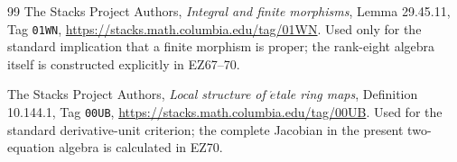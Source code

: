 \documentclass[11pt]{article}
\theoremstyle{definition}\newtheorem{definition}[theorem]{Definition}
\theoremstyle{remark}\newtheorem{remark}[theorem]{Remark}
\begin{document}
\begin{thebibliography}{99}
The Stacks Project Authors,
\emph{Integral and finite morphisms},
Lemma 29.45.11, Tag \texttt{01WN},
\url{https://stacks.math.columbia.edu/tag/01WN}.
Used only for the standard implication that a finite morphism is proper; the
rank-eight algebra itself is constructed explicitly in EZ67--70.

The Stacks Project Authors,
\emph{Local structure of \(\acute{e}\)tale ring maps},
Definition 10.144.1, Tag \texttt{00UB},
\url{https://stacks.math.columbia.edu/tag/00UB}.
Used for the standard derivative-unit criterion; the complete Jacobian in the
present two-equation algebra is calculated in EZ70.

\end{thebibliography}
\end{document}
